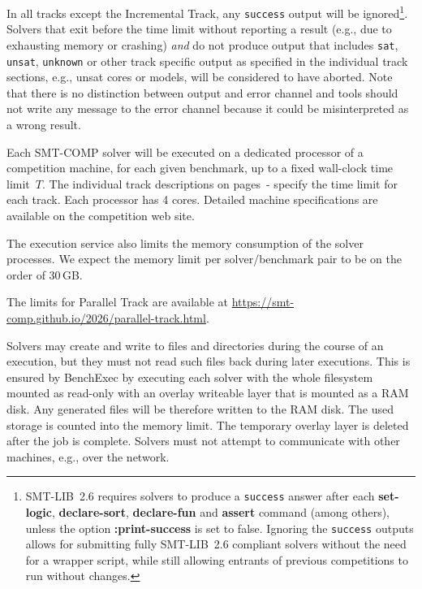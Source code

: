 \documentclass[12pt]{article}
\newcommand{\akey}[1]{\textbf{#1}\xspace}
\newcommand{\inctrack}{Incremental Track\xspace}
\newcommand{\paralleltrack}{Parallel Track\xspace}
\newcommand{\executionservice}{execution service\xspace}
\begin{document}
%
In all tracks except the \inctrack, any \texttt{success} output will be
ignored\footnote{SMT-LIB~2.6 requires solvers to produce a \texttt{success}
  answer after each \akey{set-logic}, \akey{declare-sort}, \akey{declare-fun}
  and \akey{assert} command (among others), unless the option
  \akey{:print-success} is set to false.  Ignoring the \texttt{success} outputs
  allows for submitting fully SMT-LIB~2.6 compliant solvers without the need for
  a wrapper script, while still allowing entrants of previous competitions to
  run without changes.}.  Solvers that exit before the time limit without
reporting a result (e.g., due to exhausting memory or crashing) \emph{and} do
not produce output that includes \texttt{sat}, \texttt{unsat}, \texttt{unknown}
or other track specific output as specified in the individual track sections,
e.g., unsat cores or models, will be considered to have aborted.  Note that there
is no distinction between output and error channel and tools should not write
any message to the error channel because it could be misinterpreted as a wrong
result.

%
Each SMT-COMP solver will be executed on a dedicated processor of a
competition machine, for each given benchmark, up to a fixed
wall-clock time limit~$T$. The individual track descriptions on
pages~\pageref{sec:exec:single}-\pageref{sec:exec:model} specify
the time limit for each track. Each processor has 4 cores.  Detailed
machine specifications are available on the competition web site.

The \executionservice also limits the memory consumption of the solver
processes.  We expect the memory limit per solver/benchmark pair to be
on the order of 30\,GB.

The limits for \paralleltrack{} are available at
\url{https://smt-comp.github.io/2026/parallel-track.html}.

%
Solvers may create and write to files and directories during the
course of an execution, but they must not read such files back during
later executions. This is ensured by BenchExec by executing each solver
with the whole filesystem mounted as read-only with an overlay writeable
layer that is mounted as a RAM disk. Any generated files will be therefore
written to the RAM disk. The used storage is counted into the
memory limit. The temporary overlay layer is deleted after the job is complete.
Solvers must not attempt to communicate with other machines, e.g., over the network.
\end{document}
